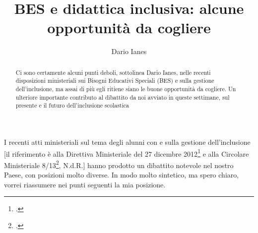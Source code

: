 \author{Dario Ianes}
\title{BES e didattica inclusiva: alcune opportunità da cogliere}
\label{cha:ianes1}
\begin{abstract}
Ci sono certamente alcuni punti deboli, sottolinea Dario Ianes, nelle recenti disposizioni ministeriali sui Bisogni Educativi Speciali (BES) e sulla gestione dell'inclusione, ma assai di più egli ritiene siano le buone opportunità da cogliere. Un ulteriore importante contributo al dibattito da noi avviato in queste settimane, sul presente e il futuro dell'inclusione scolastica
\end{abstract}
\maketitle
I recenti atti ministeriali sul tema degli alunni con   e sulla gestione dell'inclusione [il riferimento è alla Direttiva Ministeriale del 27 dicembre 2012\footcite{dir27Dic2012} e alla Circolare Ministeriale 8/13\footcite{cm8_2013}, N.d.R.] hanno prodotto un dibattito notevole nel nostro Paese, con posizioni molto diverse. In modo molto sintetico, ma spero chiaro, vorrei riassumere nei punti seguenti la mia posizione.

